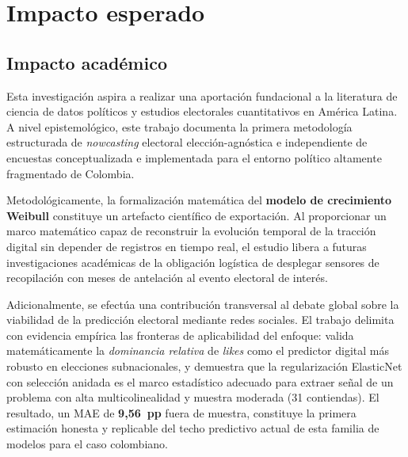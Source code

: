 

\chapter{Impacto esperado}\label{ch:impacto}

\section{Impacto académico}

Esta investigación aspira a realizar una aportación fundacional a la literatura de ciencia de datos políticos y estudios electorales cuantitativos en América Latina. A nivel epistemológico, este trabajo documenta la primera metodología estructurada de \textit{nowcasting} electoral elección-agnóstica e independiente de encuestas conceptualizada e implementada para el entorno político altamente fragmentado de Colombia.

Metodológicamente, la formalización matemática del \textbf{modelo de crecimiento Weibull} constituye un artefacto científico de exportación. Al proporcionar un marco matemático capaz de reconstruir la evolución temporal de la tracción digital sin depender de registros en tiempo real, el estudio libera a futuras investigaciones académicas de la obligación logística de desplegar sensores de recopilación con meses de antelación al evento electoral de interés.

Adicionalmente, se efectúa una contribución transversal al debate global sobre la viabilidad de la predicción electoral mediante redes sociales. El trabajo delimita con evidencia empírica las fronteras de aplicabilidad del enfoque: valida matemáticamente la \textit{dominancia relativa} de \textit{likes} como el predictor digital más robusto en elecciones subnacionales, y demuestra que la regularización ElasticNet con selección anidada es el marco estadístico adecuado para extraer señal de un problema con alta multicolinealidad y muestra moderada (31 contiendas). El resultado, un MAE de \textbf{9{,}56~pp} fuera de muestra, constituye la primera estimación honesta y replicable del techo predictivo actual de esta familia de modelos para el caso colombiano.

